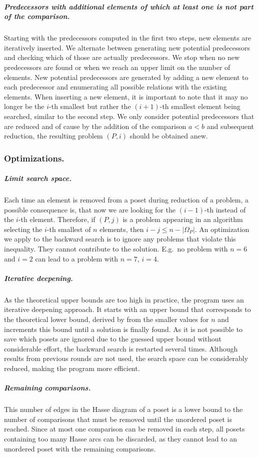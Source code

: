 \documentclass[a4paper,UKenglish,cleveref, autoref, thm-restate]{lipics-v2021}
\begin{document}
\subparagraph{Predecessors with additional elements of which at least one is not part of the comparison.}
Starting with the predecessors computed in the first two steps, new elements are iteratively inserted.
We alternate between generating new potential predecessors and checking which of those are actually predecessors.
We stop when no new predecessors are found or when we reach an upper limit on the number of elements.
New potential predecessors are generated by adding a new element to each predecessor and enumerating all possible relations with the existing elements.
When inserting a new element, it is important to note that it may no longer be the $i$-th smallest but rather the $(i + 1)$-th smallest element being searched, similar to the second step.
We only consider potential predecessors that are reduced and of cause by the addition of the comparison $a < b$ and subsequent reduction, the resulting problem $(P, i)$ should be obtained anew.

\subsubsection{Optimizations.}

\subparagraph{Limit search space.}
Each time an element is removed from a poset during reduction of a problem, a possible consequence is, that now we are looking for the $(i-1)$-th instead of the $i$-th element.
Therefore, if $(P, j)$ is a problem appearing in an algorithm selecting the $i$-th smallest of $n$ elements, then $i - j \le n - |\Omega_P|$.
An optimization we apply to the backward search is to ignore any problems that violate this inequality.
They cannot contribute to the solution.
E.g.\ no problem with $n=6$ and $i=2$ can lead to a problem with $n=7$, $i=4$.

\subparagraph{Iterative deepening.}
As the theoretical upper bounds are too high in practice, the program uses an iterative deepening approach.
It starts with an upper bound that corresponds to the theoretical lower bound, derived by  from the smaller values for $n$ and increments this bound until a solution is finally found.
As it is not possible to save which posets are ignored due to the guessed upper bound without considerable effort, the backward search is restarted several times.
Although results from previous rounds are not used, the search space can be considerably reduced, making the program more efficient.

\subparagraph{Remaining comparisons.}
This number of edges in the Hasse diagram of a poset is a lower bound to the number of comparisons that must be removed until the unordered poset is reached.
Since at most one comparison can be removed in each step, all posets containing too many Hasse arcs can be discarded, as they cannot lead to an unordered poset with the remaining comparisons.
\end{document}
